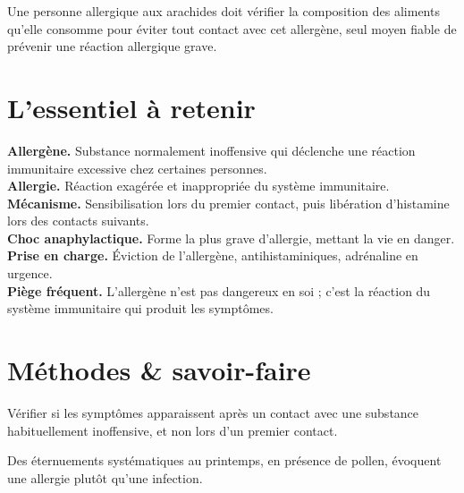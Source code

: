 \begin{exemple}
Une personne allergique aux arachides doit vérifier la composition des aliments
qu'elle consomme pour éviter tout contact avec cet allergène, seul moyen fiable de
prévenir une réaction allergique grave.
\end{exemple}

\section{L'essentiel à retenir}

\begin{synthese}
\textbf{Allergène.} Substance normalement inoffensive qui déclenche une réaction
immunitaire excessive chez certaines personnes.\\[4pt]
\textbf{Allergie.} Réaction exagérée et inappropriée du système immunitaire.\\[4pt]
\textbf{Mécanisme.} Sensibilisation lors du premier contact, puis libération
d'histamine lors des contacts suivants.\\[4pt]
\textbf{Choc anaphylactique.} Forme la plus grave d'allergie, mettant la vie en
danger.\\[4pt]
\textbf{Prise en charge.} Éviction de l'allergène, antihistaminiques, adrénaline en
urgence.\\[4pt]
\textbf{Piège fréquent.} L'allergène n'est pas dangereux en soi ; c'est la réaction du
système immunitaire qui produit les symptômes.
\end{synthese}

\section{Méthodes \& savoir-faire}

Vérifier si les symptômes apparaissent après un contact avec une substance
habituellement inoffensive, et non lors d'un premier contact.
\begin{exemple}
Des éternuements systématiques au printemps, en présence de pollen, évoquent une
allergie plutôt qu'une infection.
\end{exemple}

